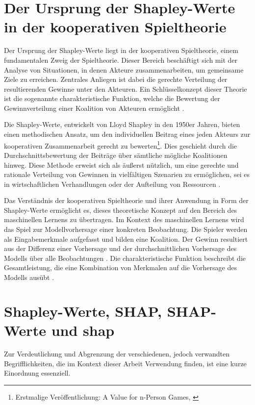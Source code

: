 \section{Der Ursprung der Shapley-Werte in der kooperativen Spieltheorie}

Der Ursprung der Shapley-Werte liegt in der kooperativen Spieltheorie, einem fundamentalen Zweig der Spieltheorie. 
Dieser Bereich beschäftigt sich mit der Analyse von Situationen, in denen Akteure zusammenarbeiten, um gemeinsame Ziele zu erreichen. 
Zentrales Anliegen ist dabei die gerechte Verteilung der resultierenden Gewinne unter den Akteuren. Ein Schlüsselkonzept dieser Theorie 
ist die sogenannte charakteristische Funktion, welche die Bewertung der Gewinnverteilung einer Koalition von Akteuren ermöglicht \cite[S. 12]{Molnar_2023}.

Die Shapley-Werte, entwickelt von Lloyd Shapley in den 1950er Jahren, bieten einen methodischen Ansatz, um den individuellen Beitrag 
eines jeden Akteurs zur kooperativen Zusammenarbeit gerecht zu bewerten\footnote{Erstmalige Veröffentlichung: \glqq{}A Value for n-Person Games\grqq{}, \cite[S. 307-318]{Shapley+1953+307+318}}. 
Dies geschieht durch die Durchschnittsbewertung der Beiträge 
über sämtliche mögliche Koalitionen hinweg. Diese Methode erweist sich als äußerst nützlich, um eine gerechte und rationale Verteilung 
von Gewinnen in vielfältigen Szenarien zu ermöglichen, sei es in wirtschaftlichen Verhandlungen oder der Aufteilung von Ressourcen \cite[S. 5572]{ijcai2022p778}.

Das Verständnis der kooperativen Spieltheorie und ihrer Anwendung in Form der Shapley-Werte ermöglicht es, dieses theoretische Konzept 
auf den Bereich des maschinellen Lernens zu übertragen. Im Kontext des maschinellen Lernens wird das Spiel zur Modellvorhersage einer konkreten
Beobachtung. Die Spieler werden als Eingabemerkmale aufgefasst und bilden eine Koalition. Der Gewinn resultiert aus der Differenz einer Vorhersage und der durchschnittlichen Vorhersage des
Modells über alle Beobachtungen \cite[S. 215]{Molnar_2022}. Die charakteristische Funktion beschreibt die Gesamtleistung, 
die eine Kombination von Merkmalen auf die Vorhersage des Modells ausübt \cite[S. 5572]{ijcai2022p778}.

\section{Shapley-Werte, SHAP, SHAP-Werte und \textsf{shap}}

Zur Verdeutlichung und Abgrenzung der verschiedenen, jedoch verwandten Begrifflichkeiten, die im Kontext dieser Arbeit Verwendung finden, 
ist eine kurze Einordnung essenziell.

